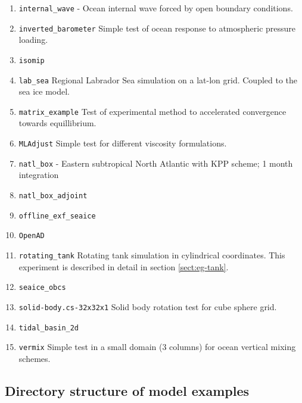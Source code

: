 \begin{enumerate}
\item \texttt{internal\_wave} - Ocean internal wave forced by open
  boundary conditions.

\item \texttt{inverted\_barometer} Simple test of ocean response to
  atmospheric pressure loading.

\item \texttt{isomip}

\item \texttt{lab\_sea} Regional Labrador Sea simulation on a lat-lon
  grid. Coupled to the sea ice model.

\item \texttt{matrix\_example} Test of experimental method to
  accelerated convergence towards equillibrium.

\item \texttt{MLAdjust} Simple test for different viscosity formulations.

\item \texttt{natl\_box} - Eastern subtropical North Atlantic with KPP
  scheme; 1 month integration

\item \texttt{natl\_box\_adjoint}

\item \texttt{offline\_exf\_seaice}
  
\item \texttt{OpenAD}

\item \texttt{rotating\_tank} Rotating tank simulation in cylindrical
  coordinates.  This experiment is described in detail in section
  \ref{sect:eg-tank}.

\item \texttt{seaice\_obcs}

\item \texttt{solid-body.cs-32x32x1} Solid body rotation test for cube
  sphere grid.

\item \texttt{tidal\_basin\_2d}

\item \texttt{vermix} Simple test in a small domain (3 columns) for
  ocean vertical mixing schemes.

\end{enumerate}

\subsection{Directory structure of model examples}

